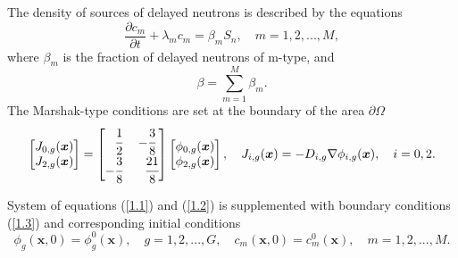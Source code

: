 \documentclass[authoryear]{elsarticle}
\begin{document}
The density of sources of delayed neutrons is described by the equations
\begin{equation}\label{1.2}
 \frac{\partial c_m}{\partial t} + \lambda_m c_m = \beta_m S_{n},
 \quad m = 1,2, ..., M, 
\end{equation}
where $\beta_m$ is the fraction of delayed neutrons of m-type, and
\[
 \beta = \sum_{m=1}^{M} \beta_m.
\] 
The Marshak-type conditions are set at the boundary of the area $\partial \Omega$
\begin{equation}\label{1.3}
\begin{split}
\begin{bmatrix}
J_{0,g}(\bm x)\\
J_{2,g}(\bm x)\\
\end{bmatrix}
=
\begin{bmatrix}
\phantom{-}\cfrac{1}{2} & -\cfrac{3}{8} \\
 -\cfrac{3}{8} & \phantom{-}\cfrac{21}{8} \\
\end{bmatrix}
\begin{bmatrix}
\phi_{0,g}(\bm x) \\
\phi_{2,g}(\bm x) \\
\end{bmatrix},
\quad
J_{i,g}(\bm x) = -D_{i,g}\nabla\phi_{i,g}(\bm x), 
\quad
i = 0, 2.
\end{split}
\end{equation}

System of equations (\ref{1.1}) and (\ref{1.2}) is supplemented with boundary conditions (\ref{1.3}) and corresponding initial conditions
\begin{equation}\label{1.4}
 \phi_g(\bm x,0) = \phi_g^0(\bm x), 
 \quad g = 1,2, ..., G,
 \quad c_m(\bm x,0) = c_m^0(\bm x), 
 \quad m = 1,2, ..., M.
\end{equation}
\end{document}
